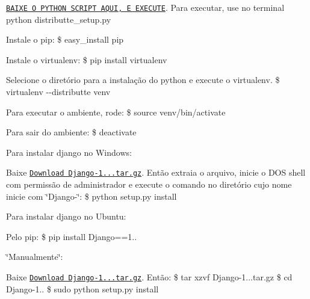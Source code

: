 \href{http://python-distribute.org/distribute_setup.py}{\tt B\-A\-I\-X\-E O P\-Y\-T\-H\-O\-N S\-C\-R\-I\-P\-T A\-Q\-U\-I, E E\-X\-E\-C\-U\-T\-E}. Para executar, use no terminal {\ttfamily python distributte\-\_\-setup.\-py}
\begin{DoxyItemize}
\item Instale o pip\-: {\ttfamily \$ easy\-\_\-install pip}
\item Instale o virtualenv\-: {\ttfamily \$ pip install virtualenv}
\item Selecione o diretório para a instalação do python e execute o virtualenv. {\ttfamily \$ virtualenv -\/-\/distributte venv}
\item Para executar o ambiente, rode\-: {\ttfamily \$ source venv/bin/activate}
\item Para sair do ambiente\-: {\ttfamily \$ deactivate}
\end{DoxyItemize}

Para instalar django no Windows\-:
\begin{DoxyItemize}
\item Baixe \href{https://www.djangoproject.com/download/1.6.2/tarball/}{\tt Download Django-\/1...\-tar.\-gz}. Então extraia o arquivo, inicie o D\-O\-S shell com permissão de administrador e execute o comando no diretório cujo nome inicie com \char`\"{}\-Django-\/\char`\"{}\-: {\ttfamily \$ python setup.\-py install}
\end{DoxyItemize}

Para instalar django no Ubuntu\-:
\begin{DoxyItemize}
\item Pelo pip\-: {\ttfamily \$ pip install Django==1..}
\item \char`\"{}\-Manualmente\char`\"{}\-:
\begin{DoxyItemize}
\item Baixe \href{https://www.djangoproject.com/download/1.6.2/tarball/}{\tt Download Django-\/1...\-tar.\-gz}. Então\-: {\ttfamily \$ tar xzvf Django-\/1...\-tar.\-gz} {\ttfamily \$ cd Django-\/1..} {\ttfamily \$ sudo python setup.\-py install} 
\end{DoxyItemize}
\end{DoxyItemize}
